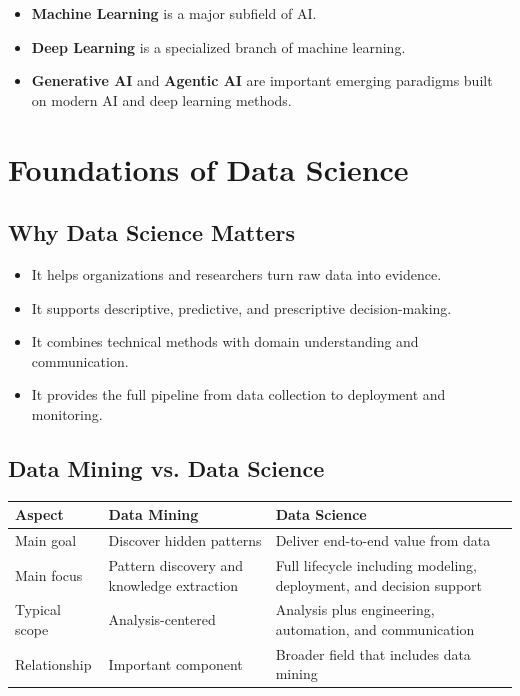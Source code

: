 \documentclass[11pt,a4paper]{article}
\begin{document}
\begin{itemize}[leftmargin=*]
  \item \textbf{Machine Learning} is a major subfield of AI.
  \item \textbf{Deep Learning} is a specialized branch of machine learning.
  \item \textbf{Generative AI} and \textbf{Agentic AI} are important emerging paradigms built on modern AI and deep learning methods.
\end{itemize}

\section{Foundations of Data Science}

\subsection{Why Data Science Matters}

\begin{itemize}[leftmargin=*]
  \item It helps organizations and researchers turn raw data into evidence.
  \item It supports descriptive, predictive, and prescriptive decision-making.
  \item It combines technical methods with domain understanding and communication.
  \item It provides the full pipeline from data collection to deployment and monitoring.
\end{itemize}

\subsection{Data Mining vs. Data Science}

\begin{center}
\begin{tabular}{@{}p{4.0cm}p{4.2cm}p{4.6cm}@{}}
\toprule
\textbf{Aspect} & \textbf{Data Mining} & \textbf{Data Science} \\
\midrule
Main goal & Discover hidden patterns & Deliver end-to-end value from data \\
Main focus & Pattern discovery and knowledge extraction & Full lifecycle including modeling, deployment, and decision support \\
Typical scope & Analysis-centered & Analysis plus engineering, automation, and communication \\
Relationship & Important component & Broader field that includes data mining \\
\bottomrule
\end{tabular}
\end{center}
\end{document}
